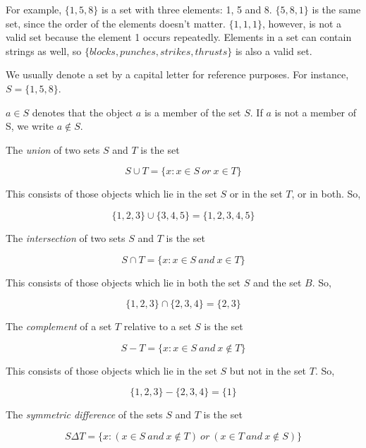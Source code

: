 \documentclass[10pt,twocolumn,a4paper]{article}
\begin{document}
  For example, $\{1,5,8\}$ is a set with three elements: 1, 5 and 8.
  $\{5,8,1\}$ is the same set, since the order of the elements doesn't matter.
  $\{1,1,1\}$, however, is not a valid set because the element 1 occurs
  repeatedly. Elements in a set can contain strings as well, so $\{blocks,
  punches, strikes, thrusts\}$ is also a valid set.

  We usually denote a set by a capital letter for reference purposes. For
  instance, $S=\{1,5,8\}$.

  $a \in S$ denotes that the object $a$ is a member of the set $S$. If $a$
  is not a member of S, we write $a \notin S$.

  The \emph{union} of two sets $S$ and $T$ is the set

  \[
    S \cup T = \{x:x \in S \: or \: x \in T\}
  \]

  

  This consists of those objects which lie in the set $S$ or in the set $T$,
  or in both. So,

  \[
    \{1, 2, 3\} \cup \{3, 4, 5\} = \{1, 2, 3, 4, 5\}
  \]

  The \emph{intersection} of two sets $S$ and $T$ is the set

  \[
    S \cap T = \{x:x \in S \: and \: x \in T\}
  \]

  

  This consists of those objects which lie in both the set $S$ and the set
  $B$. So,

  \[
    \{1, 2, 3\} \cap \{2, 3, 4\} = \{2, 3\}
  \]

  The \emph{complement} of a set $T$ relative to a set $S$ is the set

  \[
    S - T = \{x:x \in S \: and \: x \notin T\}
  \]

  

  This consists of those objects which lie in the set $S$ but not in the set
  $T$. So,

  \[
    \{1, 2, 3\} - \{2, 3, 4\} = \{1\}
  \]

  The \emph{symmetric difference} of the sets $S$ and $T$ is the set

  \[
    S \Delta T = \{x:(x \in S \: and \: x \notin T) \: or \: (x \in T \: and
    \: x \notin S)\}
  \]

  
\end{document}
